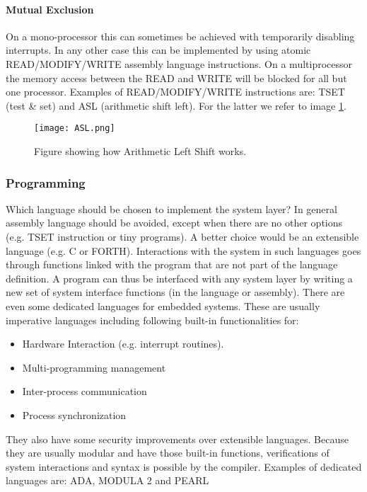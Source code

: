 \documentclass[../main.tex]{subfiles}
\begin{document}
\paragraph{Mutual Exclusion}
On a mono-processor this can sometimes be achieved with temporarily disabling interrupts.
In any other case this can be implemented by using atomic READ/MODIFY/WRITE assembly language instructions.
On a multiprocessor the memory access between the READ and WRITE will be blocked for all but one processor.
Examples of READ/MODIFY/WRITE instructions are: TSET (test \& set) and ASL (arithmetic shift left). 
For the latter we refer to image \ref{f:asl}. 

\begin{figure}
	\centering
	\texttt{[image: ASL.png]}
	\caption{Figure showing how Arithmetic Left Shift works.}
	\label{f:asl}
\end{figure}

\subsubsection{Programming}
Which language should be chosen to implement the system layer? 
In general assembly language should be avoided, except when there are no other options (e.g. TSET instruction or tiny programs).
A better choice would be an extensible language (e.g. C or FORTH).
Interactions with the system in such languages goes through functions linked with the program that are not part of the language definition. 
A program can thus be interfaced with any system layer by writing a new set of system interface functions (in the language or assembly).
There are even some dedicated languages for embedded systems. 
These are usually imperative languages including following built-in functionalities for:
\begin{itemize}
	\item Hardware Interaction (e.g. interrupt routines).
	\item Multi-programming management
	\item Inter-process communication
	\item Process synchronization
\end{itemize}
They also have some security improvements over extensible languages.
Because they are usually modular and have those built-in functions, verifications of system interactions and syntax is possible by the compiler.
Examples of dedicated languages are: ADA, MODULA 2 and PEARL
\end{document}
